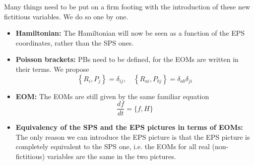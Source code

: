 Many things need to be put on a firm footing with the 
introduction of these new fictitious variables. We do so one by one.
\begin{itemize}
\item \textbf{Hamiltonian:} The Hamiltonian will now be seen
as a function of the EPS coordinates, rather than the SPS ones.
\item \textbf{Poisson brackets:} PBs need to be defined, for the EOMs are written
in their terms. We propose
\begin{equation}
\left\{R_{i}, P_{j}\right\} =\delta_{ij}, \quad\left\{R_{ai}, P_{b j}\right\}=\delta_{a b} \delta_{ji}      \label{EPS_PBs}
\end{equation}
\item \textbf{EOM:} The EOMs are still given by the same familiar equation
\begin{equation}
\frac{d f}{d t}=\{f, H\}
\end{equation}
\item \textbf{Equivalency of the SPS and the EPS pictures in terms of EOMs:}
The only reason we can introduce the EPS picture is that the EPS
picture is completely equivalent to the SPS one, i.e. the EOMs for all
real (non-fictitious) variables are the same in the two pictures.


\end{itemize}
